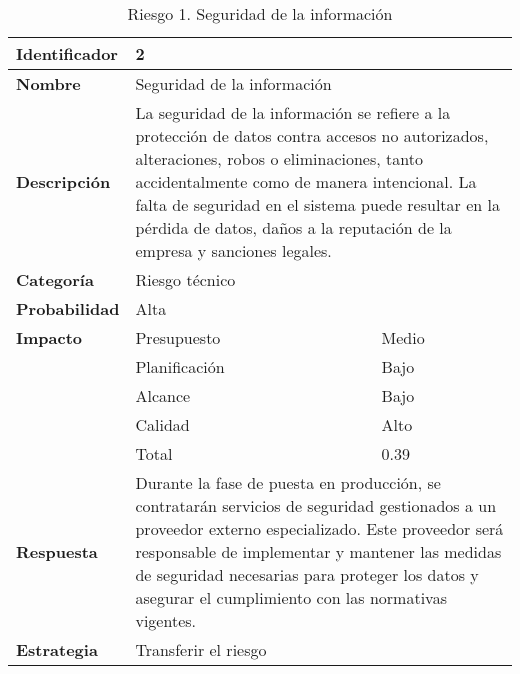 \begin{table}[H]
    \centering
    \caption{Riesgo 1. Seguridad de la información}
    \label{table:risk_seguridad-informacion}
    \begin{tabular}{>{\columncolor{lightgreen!20}}l l l}
    \toprule
    \rowcolor{lightgreen}
    \textbf{Identificador} & \multicolumn{2}{l}{2} \\
    \midrule
    \textbf{Nombre} & \multicolumn{2}{l}{Seguridad de la información} \\
    \midrule
    \textbf{Descripción} & \multicolumn{2}{p{10cm}}{La seguridad de la información se refiere a la protección de datos contra accesos no autorizados, alteraciones, robos o eliminaciones, tanto accidentalmente como de manera intencional. La falta de seguridad en el sistema puede resultar en la pérdida de datos, daños a la reputación de la empresa y sanciones legales. } \\
    \midrule
    \textbf{Categoría} & \multicolumn{2}{l}{Riesgo técnico} \\
    \midrule
    \textbf{Probabilidad} & \multicolumn{2}{l}{Alta} \\
    \midrule
    \textbf{Impacto} & Presupuesto & Medio \\
    \cmidrule(lr){2-3}
    & Planificación & Bajo \\
    \cmidrule(lr){2-3}
    & Alcance & Bajo \\
    \cmidrule(lr){2-3}
    & Calidad & Alto \\
    \cmidrule(lr){2-3}
    & Total & 0.39 \\
    \midrule
    \textbf{Respuesta} & \multicolumn{2}{p{10cm}}{Durante la fase de puesta en producción, se contratarán servicios de seguridad gestionados a un proveedor externo especializado. Este proveedor será responsable de implementar y mantener las medidas de seguridad necesarias para proteger los datos y asegurar el cumplimiento con las normativas vigentes.} \\
    \midrule
    \textbf{Estrategia} & \multicolumn{2}{l}{Transferir el riesgo} \\
    \bottomrule
    \end{tabular}
\end{table}



